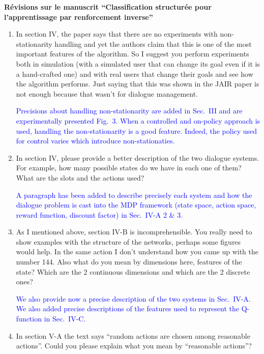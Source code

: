 \documentclass[11pt, a4paper]{letter}
\begin{document}
\begin{letter}{\large \textbf{Révisions sur le manuscrit ``Classification structurée pour l'apprentissage par renforcement inverse''}}
\begin{enumerate}
\textcolor{blue}{The classical Q-learning and SARSA algorithms are
gradient descents (first order) while KTD minimises a second error
term (second order algorithm). The convergence in the last case is
thus faster. We added this explanation at the end of the Sec.~III.}

\item In section IV, the paper says that there are no experiments with
 non-stationarity handling and yet the authors claim that this is one of the
 most important features of the algorithm. So I suggest you perform
 experiments both in simulation (with a simulated user that can change its
 goal even if it is a hand-crafted one) and with real users that change
 their goals and see how the algorithm performs. Just saying that this was
 shown in the JAIR paper is not enough because that wasn't for dialogue
 management.

\textcolor{blue}{Precisions about handling non-stationarity are
added in Sec.~III and are experimentally presented Fig.~3. When a
controlled and on-policy approach is used, handling the
non-stationarity is a good feature. Indeed, the policy used for
control varies which introduce non-stationaties.}


\item In section IV, please provide a better description of the two dialogue
 systems. For example, how many possible states do we have in each one of
 them? What are the slots and the actions used?

\textcolor{blue}{ A paragraph has been added to describe precisely
each system and how the dialogue problem is cast into the MDP
framework (state space, action space, reward function, discount
factor) in Sec.~IV-A 2 \& 3.}

\item  As I mentioned above, section IV-B is incomprehensible. You really need to
 show examples with the structure of the networks, perhaps some figures
 would help. In the same action I don't understand how you came up with the
 number 144. Also what do you mean by dimensions here, features of the
 state? Which are the 2 continuous dimensions and which are the 2 discrete
 ones?

\textcolor{blue}{We also provide now a precise description of the
two systems in Sec.~IV-A. We also added precise descriptions of the
features used to represent the Q-function in Sec.~IV-C.}


\item In section V-A the text says ``random actions are chosen among reasonable
 actions''. Could you please explain what you mean by ``reasonable actions''?


\end{enumerate}
\end{letter}
\end{document}

